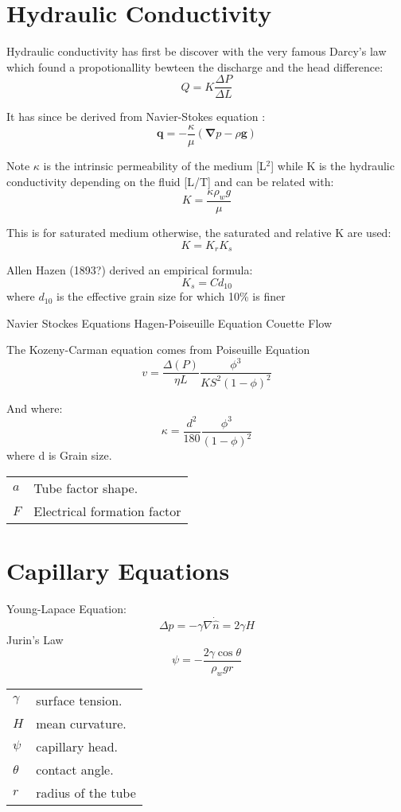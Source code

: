 \documentclass[twocolumn]{article}
\begin{document}
\section{Hydraulic Conductivity}
Hydraulic conductivity has first be discover with the very famous Darcy's law which found a propotionallity bewteen the discharge and the head difference:
$$Q=K\frac{\Delta P}{\Delta L}$$

It has since be derived from Navier-Stokes equation :
$$\boldsymbol{q}=-\frac{\kappa}{\mu}\left(\boldsymbol{\nabla} p -\rho \boldsymbol{g}\right)$$

Note $\kappa$ is the intrinsic permeability of the medium [L$^2$] while K is the hydraulic conductivity depending on the fluid [L/T] and can be related with:
$$ K=\frac{\kappa \rho_wg}{\mu} $$

This is for saturated medium otherwise, the saturated and relative K are used:
$$ K=K_rK_s$$

Allen Hazen (1893?) derived an empirical formula:
$$ K_s=C d_{10} $$
where $d_ {10}$ is the effective grain size for which 10\% is finer


Navier Stockes Equations
Hagen-Poiseuille Equation
Couette Flow

The Kozeny-Carman equation comes from Poiseuille Equation
$$v=\frac{\Delta(P)}{\eta L}\frac{\phi^{3}}{KS^{2}(1-\phi)^{2}}$$

And where:
$$\kappa = \frac{d^2}{180} \frac{\phi^3}{(1-\phi)^2}$$
 where d is Grain size.

\begin{tabular}{@{}ll@{}}
$a$  & Tube factor shape. \\
$F$ & Electrical formation factor\\
\end{tabular}

\section{Capillary Equations}
Young-Lapace Equation:
\[ \Delta p = -\gamma \nabla \dot \hat{n}=2\gamma H\]
Jurin's Law
\[ \psi=-\frac{2\gamma \cos \theta}{\rho_w g r}\]
\begin{tabular}{@{}ll@{}}
$\gamma$  & surface tension. \\
$H$ & mean curvature.\\
$\psi$ & capillary head.\\
$\theta$ & contact angle.\\
$r$ & radius of the tube
\end{tabular}
\end{document}
